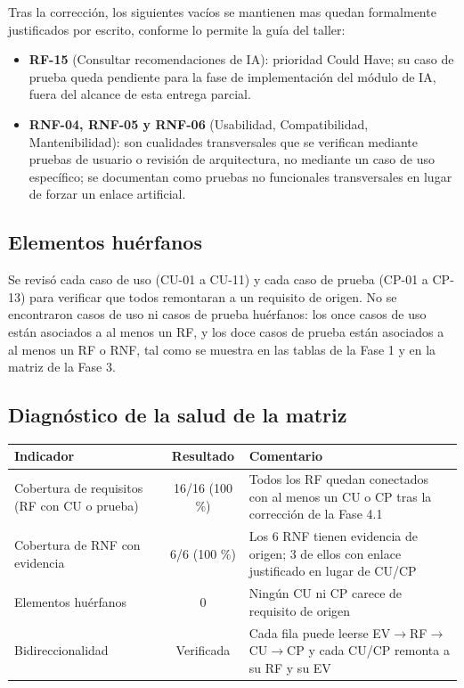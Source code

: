 \documentclass[12pt,a4paper]{article}
\begin{document}
Tras la corrección, los siguientes vacíos se mantienen mas quedan formalmente justificados por escrito, conforme lo permite la guía del taller:

\begin{itemize}[leftmargin=*]
    \item \textbf{RF-15} (Consultar recomendaciones de IA): prioridad Could Have; su caso de prueba queda pendiente para la fase de implementación del módulo de IA, fuera del alcance de esta entrega parcial.
    \item \textbf{RNF-04, RNF-05 y RNF-06} (Usabilidad, Compatibilidad, Mantenibilidad): son cualidades transversales que se verifican mediante pruebas de usuario o revisión de arquitectura, no mediante un caso de uso específico; se documentan como pruebas no funcionales transversales en lugar de forzar un enlace artificial.
\end{itemize}

\subsection{Elementos huérfanos}

Se revisó cada caso de uso (CU-01 a CU-11) y cada caso de prueba (CP-01 a CP-13) para verificar que todos remontaran a un requisito de origen. No se encontraron casos de uso ni casos de prueba huérfanos: los once casos de uso están asociados a al menos un RF, y los doce casos de prueba están asociados a al menos un RF o RNF, tal como se muestra en las tablas de la Fase 1 y en la matriz de la Fase 3.

\subsection{Diagnóstico de la salud de la matriz}

\begin{table}[H]
\centering
\begin{tabular}{@{}p{5cm}cp{7cm}@{}}
\toprule
\textbf{Indicador} & \textbf{Resultado} & \textbf{Comentario} \\
\midrule
Cobertura de requisitos (RF con CU o prueba) & 16/16 (100 \%) & Todos los RF quedan conectados con al menos un CU o CP tras la corrección de la Fase 4.1 \\
Cobertura de RNF con evidencia & 6/6 (100 \%) & Los 6 RNF tienen evidencia de origen; 3 de ellos con enlace justificado en lugar de CU/CP \\
Elementos huérfanos & 0 & Ningún CU ni CP carece de requisito de origen \\
Bidireccionalidad & Verificada & Cada fila puede leerse EV$\rightarrow$RF$\rightarrow$CU$\rightarrow$CP y cada CU/CP remonta a su RF y su EV \\
\bottomrule
\end{tabular}
\end{table}
\end{document}
